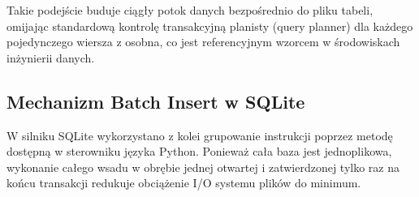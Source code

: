 \documentclass[a4paper,11pt,english,openany,oneside]{sphinxmanual}
\begin{document}
\begin{sphinxVerbatim}[commandchars=\\\{\}]

   
     
      
           

\end{sphinxVerbatim}

\sphinxAtStartPar
Takie podejście buduje ciągły potok danych bezpośrednio do pliku tabeli, omijając standardową kontrolę transakcyjną planisty (query planner) dla każdego pojedynczego wiersza z osobna, co jest referencyjnym wzorcem w środowiskach inżynierii danych.


\subsection{Mechanizm Batch Insert w SQLite}
\label{\detokenize{rozdzial_4/index:mechanizm-batch-insert-w-sqlite}}
\sphinxAtStartPar
W silniku SQLite wykorzystano z kolei grupowanie instrukcji poprzez metodę  dostępną w sterowniku języka Python. Ponieważ cała baza jest jednoplikowa, wykonanie całego wsadu w obrębie jednej otwartej i zatwierdzonej tylko raz na końcu transakcji redukuje obciążenie I/O systemu plików do minimum.

\sphinxstepscope
\end{document}
